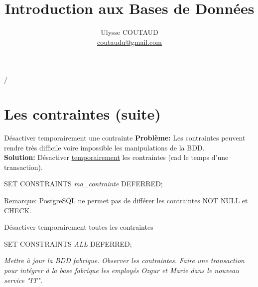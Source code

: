 \documentclass[dvipsnames]{beamer}
\begin{document}
\title{Introduction aux Bases de Données}

 {   \hspace{1em} \insertframenumber/\inserttotalframenumber }

\author{Ulysse COUTAUD\\\href{mailto:coutaudu@gmail.com}{\small coutaudu@gmail.com}}
\date{}
	
\maketitle


\section{Les contraintes (suite)}


\begin{frame}{Désactiver temporairement une contrainte}
	\textbf{Problème:} Les contraintes peuvent rendre très difficile voire impossible les manipulations de la BDD.\\
	\textbf{Solution:} Désactiver \underline{temporairement} les contraintes (cad le temps d'une transaction).
	\begin{alertblock}{}
		SET CONSTRAINTS \textit{ma\_contrainte} DEFERRED;
	\end{alertblock}
		
	Remarque: PostgreSQL ne permet pas de différer les contraintes NOT NULL et CHECK.\\
	\vspace{1em}
	


	
\end{frame}

\begin{frame}{Désactiver temporairement toutes les contraintes}
	\begin{alertblock}{}
		SET CONSTRAINTS \textit{ALL} DEFERRED;
	\end{alertblock}
	
	\textit{Mettre à jour la BDD \textit{fabrique}.}
	\textit{Observer les contraintes.}
	\textit{Faire une transaction pour intégrer à la base \textit{fabrique} les employés Ozgur et Marie dans le nouveau service "IT".}\\
	
\end{frame}
\end{document}
